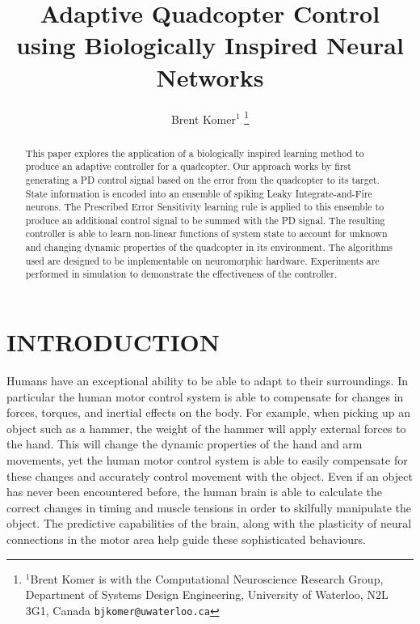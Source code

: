 \documentclass[letterpaper, 10 pt, conference]{ieeeconf}  %
\title{\LARGE \bf
Adaptive Quadcopter Control using Biologically Inspired Neural Networks
}
\author{Brent Komer$^{1}$%
\thanks{$^{1}$Brent Komer is with the Computational Neuroscience Research Group, Department of Systems Design Engineering,
        University of Waterloo, N2L 3G1, Canada
        {\tt\small bjkomer@uwaterloo.ca}}%
}
\begin{document}
\maketitle
\thispagestyle{empty}
\pagestyle{empty}


\begin{abstract}

This paper explores the application of a biologically inspired learning method to produce an adaptive controller for a quadcopter.
Our approach works by first generating a PD control signal based on the error from the quadcopter to its target.
State information is encoded into an ensemble of spiking Leaky Integrate-and-Fire neurons.
The Prescribed Error Sensitivity learning rule is applied to this ensemble to produce an additional control signal to be summed with the PD signal.
The resulting controller is able to learn non-linear functions of system state to account for unknown and changing dynamic properties of the quadcopter in its environment.
The algorithms used are designed to be implementable on neuromorphic hardware.
Experiments are performed in simulation to demonstrate the effectiveness of the controller.

\end{abstract}


\section{INTRODUCTION}

Humans have an exceptional ability to be able to adapt to their surroundings.
In particular the human motor control system is able to compensate for changes in forces, torques, and inertial effects on the body.
For example, when picking up an object such as a hammer, the weight of the hammer will apply external forces to the hand.
This will change the dynamic properties of the hand and arm movements, yet the human motor control system is able to easily compensate for these changes and accurately control movement with the object.
Even if an object has never been encountered before, the human brain is able to calculate the correct changes in timing and muscle tensions in order to skilfully manipulate the object.
The predictive capabilities of the brain, along with the plasticity of neural connections in the motor area help guide these sophisticated behaviours.
\end{document}
